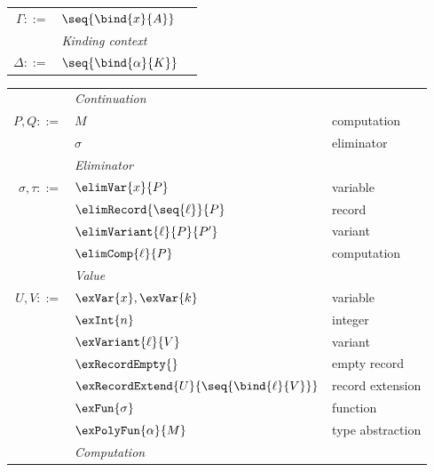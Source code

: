 \begin{figure}
{\begin{minipage}[t]{0.46\textwidth}
\begin{tabularx}{\textwidth}{rL{2.6cm}L{3cm}}
      $\Gamma ::=$
      &
      $\seq{\bind{x}{A}}$
      \\[2mm]
      &\textit{Kinding context}&
      \\
      $\Delta ::=$
      &
      $\seq{\bind{\alpha}{K}}$
\end{tabularx}
   \end{minipage}%
   \hspace{4mm}
   \begin{minipage}[t]{0.50\textwidth}
      \begin{tabularx}{\textwidth}{rL{3.9cm}L{3cm}}
         &\textit{Continuation}&
         \\
         $P, Q ::=$
         &
         $M$
         &
         computation
         \\
         &
         $\sigma$
         &
         eliminator
         \\[2mm]
         &\textit{Eliminator}&
         \\
         $\sigma, \tau ::=$
         &
         $\elimVar{x}{P}$
         &
         variable
         \\
         &
         $\elimRecord{\seq{\ell}}{P}$
         &
         record
         \\
         &
         $\elimVariant{\ell}{P}{P'}$
         &
         variant
         \\
         &
         $\elimComp{\ell}{P}$
         &
         computation
         \\[2mm]
         &\textit{Value}&
         \\
         $U, V ::=$
         &
         $\exVar{x}, \exVar{k}$
         &
         variable
         \\
         &
         $\exInt{n}$
         &
         integer
         \\
         &
         $\exVariant{\ell}{V}$
         &
         variant
         \\
         &
         $\exRecordEmpty{}$
         &
         empty record
         \\
         &
         $\exRecordExtend{U}{\seq{\bind{\ell}{V}}}$
         &
         record extension
         \\
         &
         $\exFun{\sigma}$
         &
         function
         \\
         &
         $\exPolyFun{\alpha}{M}$
         &
         type abstraction
         \\[2mm]
         &\textit{Computation}&
         \\

\end{tabularx}
\end{minipage}}
\end{figure}
